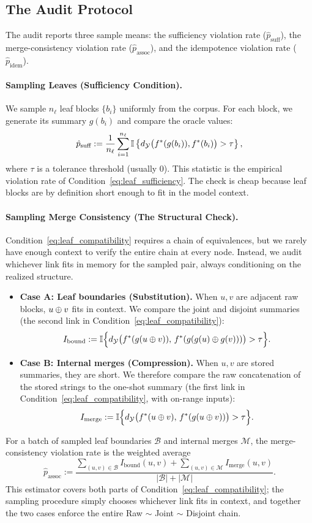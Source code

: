\subsection{The Audit Protocol}

The audit reports three sample means: the sufficiency violation rate ($\hat{p}_{\text{suff}}$), the merge-consistency violation rate ($\hat{p}_{\text{assoc}}$), and the idempotence violation rate ($\hat{p}_{\text{idem}}$).

\paragraph{Sampling Leaves (Sufficiency Condition).}
We sample $n_\ell$ leaf blocks $\{b_i\}$ uniformly from the corpus. For each block, we generate its summary $g(b_i)$ and compare the oracle values:
\[
\hat{p}_{\text{suff}} := \frac{1}{n_\ell} \sum_{i=1}^{n_\ell} \mathbb{I}\left\{ d_{\mathcal{Y}}\big(f^{\ast}(g(b_i)), f^{\ast}(b_i)\big) > \tau \right\},
\]
where $\tau$ is a tolerance threshold (usually 0). This statistic is the empirical violation rate of Condition~\eqref{eq:leaf_sufficiency}. The check is cheap because leaf blocks are by definition short enough to fit in the model context.

\paragraph{Sampling Merge Consistency (The Structural Check).}
Condition~\eqref{eq:leaf_compatibility} requires a chain of equivalences, but we rarely have enough context to verify the entire chain at every node. Instead, we audit whichever link fits in memory for the sampled pair, always conditioning on the realized structure.
\begin{itemize}
    \item \textbf{Case A: Leaf boundaries (Substitution).} When $u,v$ are adjacent raw blocks, $u\oplus v$ fits in context. We compare the joint and disjoint summaries (the second link in Condition~\eqref{eq:leaf_compatibility}):
    \[
    I_{\text{bound}} := \mathbb{I}\Big\{ d_{\mathcal{Y}}\big(f^{\ast}(g(u\oplus v)),\,f^{\ast}(g(g(u)\oplus g(v)))\big) > \tau \Big\}.
    \]
    \item \textbf{Case B: Internal merges (Compression).} When $u,v$ are stored summaries, they are short. We therefore compare the raw concatenation of the stored strings to the one-shot summary (the first link in Condition~\eqref{eq:leaf_compatibility}, with on-range inputs):
    \[
    I_{\text{merge}} := \mathbb{I}\Big\{ d_{\mathcal{Y}}\big(f^{\ast}(u\oplus v),\,f^{\ast}(g(u\oplus v))\big) > \tau \Big\}.
    \]
\end{itemize}
For a batch of sampled leaf boundaries $\mathcal{B}$ and internal merges $\mathcal{M}$, the merge-consistency violation rate is the weighted average
\[
\hat{p}_{\text{assoc}} := \frac{\sum_{(u,v)\in\mathcal{B}} I_{\text{bound}}(u,v) + \sum_{(u,v)\in\mathcal{M}} I_{\text{merge}}(u,v)}{|\mathcal{B}| + |\mathcal{M}|}.
\]
This estimator covers both parts of Condition~\eqref{eq:leaf_compatibility}; the sampling procedure simply chooses whichever link fits in context, and together the two cases enforce the entire Raw $\sim$ Joint $\sim$ Disjoint chain.

